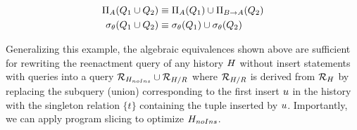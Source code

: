 \begin{align*}
  \Pi_A(Q_1  \cup Q_2) &\equiv \Pi_A(Q_1) \cup \Pi_{B \to A}(Q_2)\\
  \sigma_{\theta}(Q_1 \cup Q_2) &\equiv \sigma_\theta(Q_1) \cup \sigma_\theta(Q_2)
\end{align*}

Generalizing this example, the algebraic equivalences shown above are sufficient for rewriting the reenactment query of any history $H$ without insert statements with queries into a query $\mathcal{R}_{H_{noIns}} \cup \mathcal{R}_{H / R}$ where  $\mathcal{R}_{H / R}$ is derived from $\mathcal{R}_{H}$ by replacing the subquery (union) corresponding to the first insert $u$ in the history with the singleton relation $\{t\}$ containing the tuple inserted by $u$. Importantly, we can apply program slicing to optimize $H_{noIns}$.


